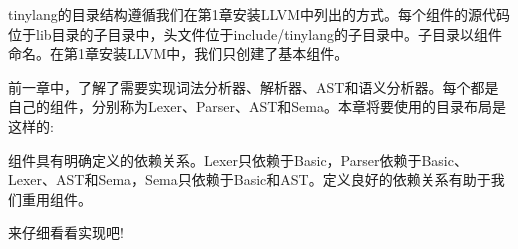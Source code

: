 tinylang的目录结构遵循我们在第1章安装LLVM中列出的方式。每个组件的源代码位于lib目录的子目录中，头文件位于include/tinylang的子目录中。子目录以组件命名。在第1章安装LLVM中，我们只创建了基本组件。

前一章中，了解了需要实现词法分析器、解析器、AST和语义分析器。每个都是自己的组件，分别称为Lexer、Parser、AST和Sema。本章将要使用的目录布局是这样的:


组件具有明确定义的依赖关系。Lexer只依赖于Basic，Parser依赖于Basic、Lexer、AST和Sema，Sema只依赖于Basic和AST。定义良好的依赖关系有助于我们重用组件。

来仔细看看实现吧!
